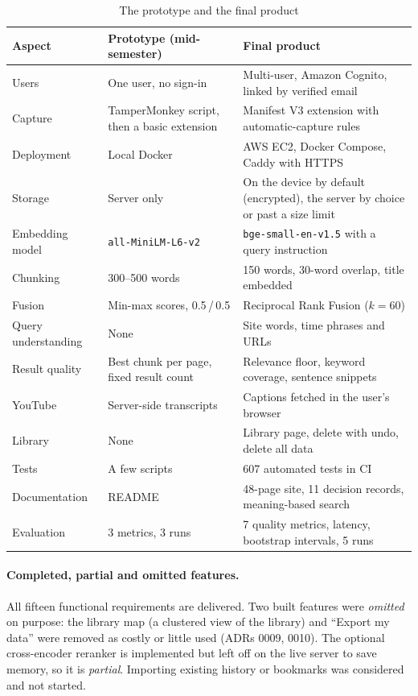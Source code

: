 \begin{table}[H]
\centering
\footnotesize
\begin{tabularx}{\textwidth}{>{\raggedright\arraybackslash}p{} L L}
\toprule
\textbf{Aspect} & \textbf{Prototype (mid-semester)} & \textbf{Final product} \\
\midrule
Users & One user, no sign-in & Multi-user, Amazon Cognito, linked by verified email \\
Capture & TamperMonkey script, then a basic extension & Manifest V3 extension with automatic-capture rules \\
Deployment & Local Docker & AWS EC2, Docker Compose, Caddy with HTTPS \\
Storage & Server only & On the device by default (encrypted), the server by choice or past a size limit \\
Embedding model & \texttt{all-MiniLM-L6-v2} & \texttt{bge-small-en-v1.5} with a query instruction \\
Chunking & 300--500 words & 150 words, 30-word overlap, title embedded \\
Fusion & Min-max scores, 0.5\,/\,0.5 & Reciprocal Rank Fusion ($k=60$) \\
Query understanding & None & Site words, time phrases and URLs \\
Result quality & Best chunk per page, fixed result count & Relevance floor, keyword coverage, sentence snippets \\
YouTube & Server-side transcripts & Captions fetched in the user's browser \\
Library & None & Library page, delete with undo, delete all data \\
Tests & A few scripts & 607 automated tests in CI \\
Documentation & README & 48-page site, 11 decision records, meaning-based search \\
Evaluation & 3 metrics, 3 runs & 7 quality metrics, latency, bootstrap intervals, 5 runs \\
\bottomrule
\end{tabularx}
\caption{The prototype and the final product}
\label{tab:prototype-vs-final}
\end{table}

\paragraph{Completed, partial and omitted features.} All fifteen functional
requirements are delivered. Two built features were \emph{omitted} on
purpose: the library map (a clustered view of the library) and ``Export my
data'' were removed as costly or little used (ADRs 0009, 0010). The optional
cross-encoder reranker is implemented but left off on the live server to save
memory, so it is \emph{partial}. Importing existing history or bookmarks was
considered and not started.
